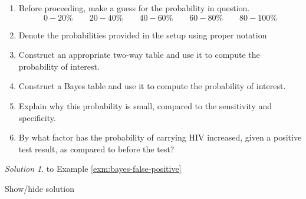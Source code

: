 \documentclass[
]{book}
\providecommand{\tightlist}{%
  \setlength{\itemsep}{0pt}\setlength{\parskip}{0pt}}
\theoremstyle{definition}
\theoremstyle{definition}
\theoremstyle{definition}
\theoremstyle{remark}
\newtheorem*{solution}{Solution}
\begin{document}
\begin{enumerate}
\def\labelenumi{\arabic{enumi}.}
\tightlist
\item
  Before proceeding, make a guess for the probability in question.
  \[
  0-20\% \qquad 20-40\% \qquad 40-60\% \qquad 60-80\% \qquad 80-100\%
  \]
\item
  Denote the probabilities provided in the setup using proper notation
\item
  Construct an appropriate two-way table and use it to compute the probability of interest.
\item
  Construct a Bayes table and use it to compute the probability of interest.
\item
  Explain why this probability is small, compared to the sensitivity and specificity.
\item
  By what factor has the probability of carrying HIV increased, given a positive test result, as compared to before the test?
\end{enumerate}

\begin{solution}
{}to Example \ref{exm:bayes-false-positive}
\end{solution}

Show/hide solution
\end{document}

